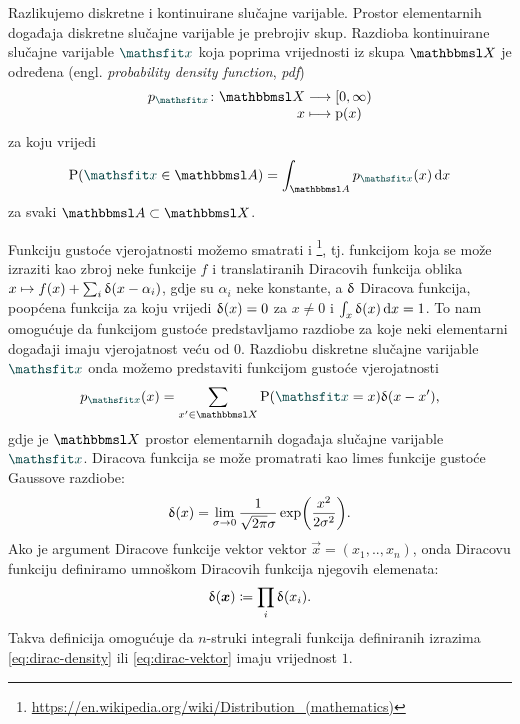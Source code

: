 \documentclass[utf8, diplomski, lmodern]{fer}
\begin{document}
Razlikujemo diskretne i kontinuirane slučajne varijable. Prostor elementarnih događaja diskretne slučajne varijable je prebrojiv skup. Razdioba kontinuirane slučajne varijable $\rvar x$ koja poprima vrijednosti iz skupa $\set X$ je određena  (engl. \textit{probability density function}, \textit{pdf})
\begin{align*}
\fullfunction{p_{\rvar x}}{\set X }{\intco{0,\infty}}{x}{\p(x)}
\end{align*}
za koju vrijedi
\begin{align}
\P(\rvar x\in \set A) = \int_{\set A} p_{\rvar x}(x)\dif x
\end{align}
za svaki $\set A\subset\set X$.

Funkciju gustoće vjerojatnosti možemo smatrati i \footnote{\url{https://en.wikipedia.org/wiki/Distribution_(mathematics)}}, tj. funkcijom koja se može izraziti kao zbroj neke funkcije $f$ i translatiranih Diracovih funkcija oblika $x\mapsto f(x)+\sum_i\updelta(x-\alpha_i)$, gdje su $\alpha_i$ neke konstante, a $\updelta$ Diracova funkcija, poopćena funkcija za koju vrijedi $\updelta(x)=0$ za $x\neq0$ i $\int_x\updelta(x)\mathop{}\!\mathrm{d} x=1$. To nam omogućuje da funkcijom gustoće predstavljamo razdiobe za koje neki elementarni događaji imaju vjerojatnost veću od $0$. Razdiobu diskretne slučajne varijable $\rvar x$ onda možemo predstaviti funkcijom gustoće vjerojatnosti 
\begin{align} \label{eq:dirac-density}
p_{\rvar x}(x)=\sum_{x'\in\set X} \P(\rvar x=x) \dirac(x-x')  \text{,}
\end{align}
gdje je $\set X$ prostor elementarnih događaja slučajne varijable $\rvar x$. Diracova funkcija se može promatrati kao limes funkcije gustoće Gaussove razdiobe:
\begin{align*}
\dirac(x)=\lim_{\sigma\to 0}\frac{1}{\sqrt{2\pi}\sigma}\exp\del{\frac{x^2}{2\sigma^2}}.
\end{align*}
Ako je argument Diracove funkcije vektor vektor $\vec x=(x_1,..,x_n)$, onda Diracovu funkciju definiramo umnoškom Diracovih funkcija njegovih elemenata:
\begin{align} \label{eq:dirac-vektor}
\dirac(\vec x)\coloneqq\prod_i\dirac(x_i) \text{.}
\end{align}
Takva definicija omogućuje da $n$-struki integrali funkcija definiranih izrazima \eqref{eq:dirac-density} ili \eqref{eq:dirac-vektor} imaju vrijednost $1$.

\end{document}
